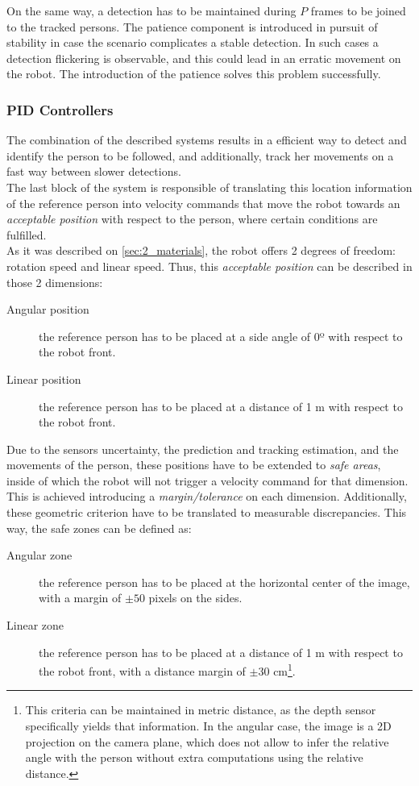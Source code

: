 On the same way, a detection has to be maintained during $P$ frames to be joined to the tracked persons. The patience component is introduced in pursuit of stability in case the scenario complicates a stable detection. In such cases a detection flickering is observable, and this could lead in an erratic movement on the robot. The introduction of the patience solves this problem successfully.


\subsubsection{PID Controllers}
The combination of the described systems results in a efficient way to detect and identify the person to be followed, and additionally, track her movements on a fast way between slower detections.\\

The last block of the system is responsible of  translating this location information of the reference person into velocity commands that move the robot towards an \textit{acceptable position} with respect to the person, where certain conditions are fulfilled.\\

As it was described on \autoref{sec:2_materials}, the robot offers 2 degrees of freedom: rotation speed and linear speed. Thus, this \textit{acceptable position} can be described in those 2 dimensions:
\begin{description}
	\item[Angular position] the reference person has to be placed at a side angle of 0º with respect to the robot front.
	\item[Linear position] the reference person has to be placed at a distance of 1 m with respect to the robot front.
\end{description}

Due to the sensors uncertainty, the prediction and tracking estimation, and the movements of the person, these positions have to be extended to \textit{safe areas}, inside of which the robot will not trigger a velocity command for that dimension. This is achieved introducing a \textit{margin/tolerance} on each dimension. Additionally, these geometric criterion have to be translated to measurable discrepancies. This way, the safe zones can be defined as:

\begin{description}
	\item[Angular zone] the reference person has to be placed at the horizontal center of the image, with a margin of $\pm 50$ pixels on the sides.
	\item[Linear zone] the reference person has to be placed at a distance of 1 m with respect to the robot front, with a distance margin of $\pm 30$ cm\footnote{This criteria can be maintained in metric distance, as the depth sensor specifically yields that information. In the angular case, the image is a 2D projection on the camera plane, which does not allow to infer the relative angle with the person without extra computations using the relative distance.}.
\end{description}

